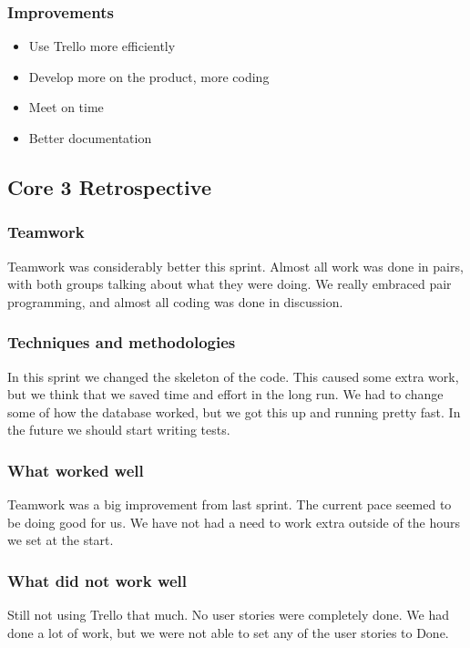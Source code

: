 \subsubsection{Improvements}
\begin{itemize}
    \item Use Trello more efficiently
    \item Develop more on the product, more coding
    \item Meet on time
    \item Better documentation
\end{itemize}

\subsection{Core 3 Retrospective}
\subsubsection{Teamwork}
Teamwork was considerably better this sprint. Almost all work was done in pairs, with both groups talking about what they were doing. We really embraced pair programming, and almost all coding was done in discussion.

\subsubsection{Techniques and methodologies}
In this sprint we changed the skeleton of the code. This caused some extra work, but we think that we saved time and effort in the long run. We had to change some of how the database worked, but we got this up and running pretty fast. In the future we should start writing tests. 

\subsubsection{What worked well}
Teamwork was a big improvement from last sprint. The current pace seemed to be doing good for us. We have not had a need to work extra outside of the hours we set at the start.

\subsubsection{What did not work well}
Still not using Trello that much. No user stories were completely done. We had done a lot of work, but we were not able to set any of the user stories to Done. 

